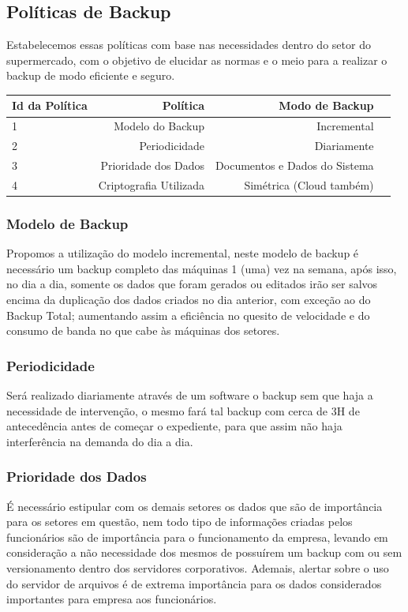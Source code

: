 \documentclass[12pt]{article}
\begin{document}
\subsection{Políticas de Backup}
Estabelecemos essas políticas com base nas necessidades dentro do setor do supermercado, com o objetivo de elucidar as normas e o meio para a realizar o backup de modo eficiente e seguro.

\begin{center}
\begin{tabular}{| l | r | r | r |}
\hline 
Id da Política & Política & Modo de Backup\\
\hline
1 & Modelo do Backup & Incremental\\
2 & Periodicidade & Diariamente\\
3 & Prioridade dos Dados & Documentos e Dados do Sistema\\
4 & Criptografia Utilizada & Simétrica (Cloud também)\\
\hline
\end{tabular}
\end{center}

\subsubsection{Modelo de Backup}
Propomos a utilização do modelo incremental, neste modelo de backup é necessário um backup completo das máquinas 1 (uma) vez na semana, após isso, no dia a dia, somente os dados que foram gerados ou editados irão ser salvos encima da duplicação dos dados criados no dia anterior, com exceção ao do Backup Total; aumentando assim a eficiência no quesito de velocidade e do consumo de banda no que cabe às máquinas dos setores.

\subsubsection{Periodicidade}
Será realizado diariamente através de um software o backup sem que haja a necessidade de intervenção, o mesmo fará tal backup com cerca de 3H de antecedência antes de começar o expediente, para que assim não haja interferência na demanda do dia a dia. 

\subsubsection{Prioridade dos Dados}
É necessário estipular com os demais setores os dados que são de importância para os setores em questão, nem todo tipo de informações criadas pelos funcionários são de importância para o funcionamento da empresa, levando em consideração a não necessidade dos mesmos de possuírem um backup com ou sem versionamento dentro dos servidores corporativos. Ademais, alertar sobre o uso do servidor de arquivos é de extrema importância para os dados considerados importantes para empresa aos funcionários.
\end{document}
